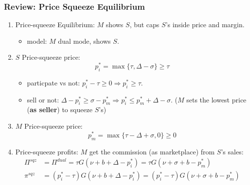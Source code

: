   
\begin{frame}
  \frametitle{Review: Price Squeeze Equilibrium}
  \begin{enumerate}
    \item Price-squeeze Equilibrium: $M$ shows $S$, but caps $S$'s inside price and margin.
    \begin{itemize}
      \item model: $M$ dual mode, shows $S$.
    \end{itemize}
    \item $S$ Price-squeeze price:
    \begin{equation}\label{eq:price-squeeze-price-s}
      p_i^* = \max\{\tau, \Delta - \sigma\} \geq \tau
    \end{equation}
    \begin{itemize}
      \item particpate vs not: $p_i^* - \tau \geq 0 \Rightarrow p_i^* \geq \tau$.
      \item sell or not: $\Delta - p_i^* \geq \sigma - p_m^* \Rightarrow p_i^* \leq p_m^* + \Delta - \sigma$. ($M$ sets the lowest price (\textbf{as seller}) to squeeze $S$'s)
      
    \end{itemize}
    \item $M$ Price-squeeze price:
      \begin{equation}\label{eq:price-squeeze-price-m}
        p_m^*=\max\{\tau-\Delta+\sigma,0\} \geq 0
      \end{equation}
    \item Price-squeeze profits: $M$ get the commission (as marketplace) from $S$'s sales:
    \begin{equation}\label{eq:price-squeeze-equi}
        \begin{aligned}
          \Pi^{sqz} & = \Pi^{dual} = \tau G(\nu + b + \Delta - p_i^*) = \tau G(\nu + \sigma + b - p^*_m) \\
        \pi^{sqz} & = (p_i^*-\tau) G(\nu + b + \Delta - p_i^*) = (p_i^*-\tau) G(\nu + \sigma + b - p^*_m) 
        \end{aligned}
    \end{equation}
  \end{enumerate}
\end{frame}

